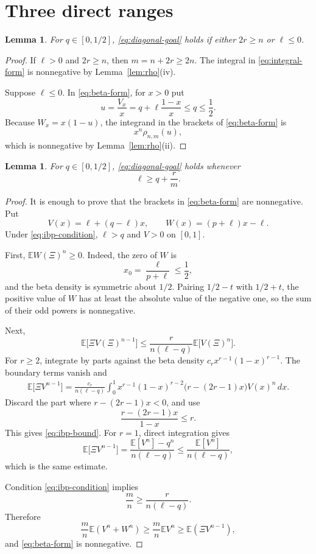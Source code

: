 \documentclass[11pt]{article}
\numberwithin{equation}{section}
\newtheorem{lemma}[theorem]{Lemma}
\newcommand{\E}{\mathbb E}
\begin{document}
\section{Three direct ranges}

\begin{lemma}\label{lem:direct-ranges}
For $q\in[0,1/2]$, \eqref{eq:diagonal-goal} holds if either $2r\ge n$ or $\ell\le0$.
\end{lemma}

\begin{proof}
If $\ell>0$ and $2r\ge n$, then $m=n+2r\ge2n$. The integral in \eqref{eq:integral-form} is nonnegative by Lemma~\ref{lem:rho}(iv).

Suppose $\ell\le0$. In \eqref{eq:beta-form}, for $x>0$ put
\[
        u=\frac{V_x}{x}=q+\ell\frac{1-x}{x}\le q\le\frac12.
\]
Because $W_x=x(1-u)$, the integrand in the brackets of \eqref{eq:beta-form} is
\[
        x^n\rho_{n,m}(u),
\]
which is nonnegative by Lemma~\ref{lem:rho}(ii).
\end{proof}

\begin{lemma}\label{lem:ibp}
For $q\in[0,1/2]$, \eqref{eq:diagonal-goal} holds whenever
\begin{equation}\label{eq:ibp-condition}
        \ell\ge q+\frac rm.
\end{equation}
\end{lemma}

\begin{proof}
It is enough to prove that the brackets in \eqref{eq:beta-form} are nonnegative. Put
\[
        V(x)=\ell+(q-\ell)x,
        \qquad
        W(x)=(p+\ell)x-\ell.
\]
Under \eqref{eq:ibp-condition}, $\ell>q$ and $V>0$ on $[0,1]$.

First, $\E W(\Xi)^n\ge0$. Indeed, the zero of $W$ is
\[
        x_0=\frac{\ell}{p+\ell}\le\frac12,
\]
and the beta density is symmetric about $1/2$. Pairing $1/2-t$ with $1/2+t$, the positive value of $W$ has at least the absolute value of the negative one, so the sum of their odd powers is nonnegative.

Next,
\begin{equation}\label{eq:ibp-bound}
        \E\bigl[\Xi V(\Xi)^{n-1}\bigr]
        \le\frac{r}{n(\ell-q)}\E\bigl[V(\Xi)^n\bigr].
\end{equation}
For $r\ge2$, integrate by parts against the beta density $c_rx^{r-1}(1-x)^{r-1}$. The boundary terms vanish and
\[
\begin{aligned}
 \E\bigl[\Xi V^{n-1}\bigr]
 =\frac{c_r}{n(\ell-q)}
 \int_0^1x^{r-1}(1-x)^{r-2}
 \bigl(r-(2r-1)x\bigr)V(x)^n\,dx.
\end{aligned}
\]
Discard the part where $r-(2r-1)x<0$, and use
\[
        \frac{r-(2r-1)x}{1-x}\le r.
\]
This gives \eqref{eq:ibp-bound}. For $r=1$, direct integration gives
\[
 \E\bigl[\Xi V^{n-1}\bigr]
 =\frac{\E[V^n]-q^n}{n(\ell-q)}
 \le\frac{\E[V^n]}{n(\ell-q)},
\]
which is the same estimate.

Condition \eqref{eq:ibp-condition} implies
\[
        \frac mn\ge\frac{r}{n(\ell-q)}.
\]
Therefore
\[
 \frac mn\E(V^n+W^n)
 \ge\frac mn\E V^n
 \ge\E(\Xi V^{n-1}),
\]
and \eqref{eq:beta-form} is nonnegative.
\end{proof}
\end{document}
